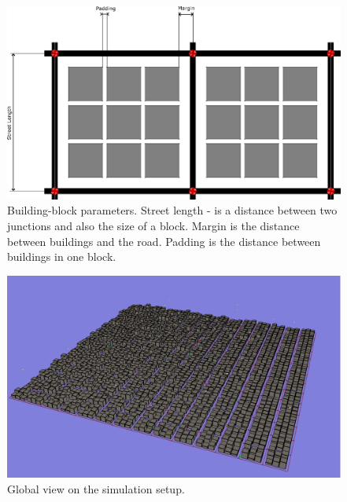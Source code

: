 \documentclass[]{nsm-thesis}
\begin{document}
\begin{figure}
	\centering
	\includegraphics[width=1\textwidth]{figures/ManhattanGridBlock-commented.png}
	\caption{Building-block parameters. Street length - is a distance between two junctions and also the size of a block. Margin is the distance between buildings and the road. Padding is the distance between buildings in one block.}
	\label{fig:manhattangridblock}
\end{figure}

\begin{figure}
	\centering
	\includegraphics[width=1\textwidth]{figures/GlobalView3D.png}
	\caption{Global view on the simulation setup.}
	\label{fig:manhattangrid3d}
\end{figure}
\end{document}
